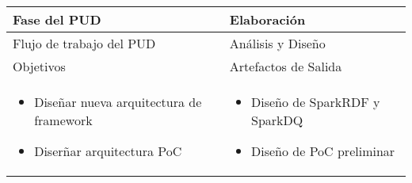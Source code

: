 \vspace{1cm}
\begin{tabular}{|p{}|p{}|}

\hline

\cellcolor[gray]{0.7}Fase del \acs{PUD} & Elaboración
 \\
\hline

\cellcolor[gray]{0.7}Flujo de trabajo del \acs{PUD} & Análisis y Diseño

 \\
\hline


\cellcolor[gray]{0.7}Objetivos  &
\cellcolor[gray]{0.7}Artefactos de Salida \\
\hline

\begin{itemize}
\item Diseñar nueva arquitectura de framework
\item Diserñar arquitectura PoC
\end{itemize}

&

\begin{itemize}
\item Diseño de SparkRDF y SparkDQ
\item Diseño de \acs{PoC} preliminar
\end{itemize}

 \\
\hline
\end{tabular}


